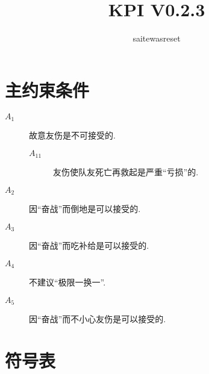 \documentclass{ctexart}
\begin{document}
\title{KPI V0.2.3}
\author{saitewasreset}

\maketitle

\tableofcontents

\section{主约束条件}

\begin{description}
    \item[$A_1$] 故意友伤是不可接受的.
          \begin{description}
              \item[$A_{11}$] 友伤使队友死亡再救起是严重“亏损”的.
          \end{description}
    \item[$A_2$] 因“奋战”而倒地是可以接受的.
    \item[$A_3$] 因“奋战”而吃补给是可以接受的.
    \item[$A_4$] 不建议“极限一换一”.
    \item[$A_5$] 因“奋战”而不小心友伤是可以接受的.
\end{description}

\section{符号表}
\end{document}

